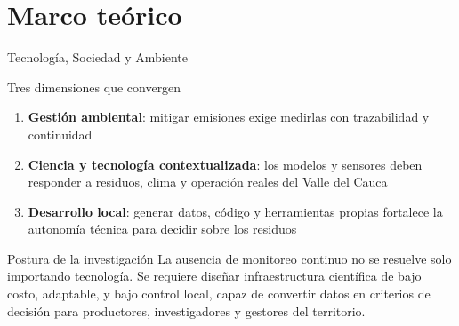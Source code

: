 \documentclass[aspectratio=169, 11pt]{beamer}
\begin{document}
\section{Marco teórico}
\begin{frame}{Tecnología, Sociedad y Ambiente}

\begin{block}{Tres dimensiones que convergen}
\footnotesize
\begin{enumerate}
   \item \textbf{Gestión ambiental}: mitigar emisiones exige medirlas 
con trazabilidad y continuidad~\cite{ak-bhdWEATHERCLIMATEWATER,jenkinsProcessingPoultryManure2025,rossiEstimatingDynamicsGreenhouse2024a}

   \item \textbf{Ciencia y tecnología contextualizada}: los modelos y sensores deben responder a residuos, clima y operación reales del Valle del Cauca~\cite{minciencias2020guia}
\item \textbf{Desarrollo local}: generar datos, código y herramientas propias 
fortalece la autonomía técnica para decidir sobre los residuos~\cite{carolanAutomatedAgrifoodFutures2020,klerkxReviewSocialScience2019a}

\end{enumerate}
\end{block}

\vspace{0.2cm}

\begin{alertblock}{Postura de la investigación}
\footnotesize
La ausencia de monitoreo continuo no se resuelve solo importando tecnología. Se requiere diseñar infraestructura científica de bajo costo, adaptable, y bajo control local, capaz de convertir datos en criterios de decisión para productores, investigadores y gestores del territorio.
\end{alertblock}
\end{frame}
\end{document}
